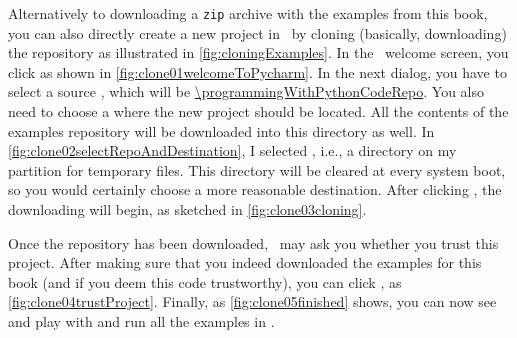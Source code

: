%
\begin{sloppypar}%
Alternatively to downloading a \texttt{zip} archive with the examples from this book, you can also directly create a new project in \pycharm\ by cloning (basically, downloading) the repository as illustrated in \cref{fig:cloningExamples}.
In the \pycharm\ welcome screen, you click  as shown in \cref{fig:clone01welcomeToPycharm}.
In the next dialog, you have to select a source , which will be \expandafter\url{\programmingWithPythonCodeRepo}.
You also need to choose a  where the new project should be located.
All the contents of the examples repository will be downloaded into this directory as well.
In \cref{fig:clone02selectRepoAndDestination}, I selected , i.e., a directory on my partition for temporary files.
This directory will be cleared at every system boot, so you would certainly choose a more reasonable destination.
After clicking , the downloading will begin, as sketched in \cref{fig:clone03cloning}.%
\end{sloppypar}%
%
Once the repository has been downloaded, \pycharm\ may ask you whether you trust this project.
After making sure that you indeed downloaded the examples for this book (and if you deem this code trustworthy), you can click , as \cref{fig:clone04trustProject}.
Finally, as \cref{fig:clone05finished} shows, you can now see and play with and run all the examples in \pycharm.%
%
\endhsection%
%
